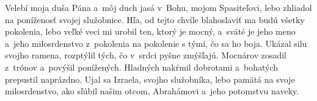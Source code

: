 Velebí
moja duša Pána
\versseparator
a~môj duch jasá
v~Bohu, mojom Spasiteľovi,
\versseparator
lebo zhliadol na poníženosť svojej služobnice.
Hľa, od tejto chvíle blahoslaviť ma budú všetky pokolenia,
\versseparator
lebo veľké veci mi urobil ten, ktorý je mocný,
a~sväté je jeho meno
\versseparator
a~jeho milosrdenstvo z~pokolenia na pokolenie
s tými, čo sa ho boja.
\versseparator
Ukázal silu svojho ramena,
rozptýlil tých, čo v~srdci pyšne zmýšľajú.
\versseparator
Mocnárov zosadil z~trónov
a~povýšil ponížených.
\versseparator
Hladných nakŕmil dobrotami
a~bohatých prepustil naprázdno.
\versseparator
Ujal sa Izraela, svojho služobníka,
lebo pamätá na svoje milosrdenstvo,
\versseparator
ako sľúbil našim otcom,
Abrahámovi a~jeho potomstvu naveky.